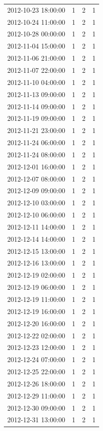 \begin{tabular}{lrrr}
2012-10-23 18:00:00 & 1 & 2 & 1 \\
2012-10-24 11:00:00 & 1 & 2 & 1 \\
2012-10-28 00:00:00 & 1 & 2 & 1 \\
2012-11-04 15:00:00 & 1 & 2 & 1 \\
2012-11-06 21:00:00 & 1 & 2 & 1 \\
2012-11-07 22:00:00 & 1 & 2 & 1 \\
2012-11-10 04:00:00 & 1 & 2 & 1 \\
2012-11-13 09:00:00 & 1 & 2 & 1 \\
2012-11-14 09:00:00 & 1 & 2 & 1 \\
2012-11-19 09:00:00 & 1 & 2 & 1 \\
2012-11-21 23:00:00 & 1 & 2 & 1 \\
2012-11-24 06:00:00 & 1 & 2 & 1 \\
2012-11-24 08:00:00 & 1 & 2 & 1 \\
2012-12-01 16:00:00 & 1 & 2 & 1 \\
2012-12-07 08:00:00 & 1 & 2 & 1 \\
2012-12-09 09:00:00 & 1 & 2 & 1 \\
2012-12-10 03:00:00 & 1 & 2 & 1 \\
2012-12-10 06:00:00 & 1 & 2 & 1 \\
2012-12-11 14:00:00 & 1 & 2 & 1 \\
2012-12-14 14:00:00 & 1 & 2 & 1 \\
2012-12-15 13:00:00 & 1 & 2 & 1 \\
2012-12-16 13:00:00 & 1 & 2 & 1 \\
2012-12-19 02:00:00 & 1 & 2 & 1 \\
2012-12-19 06:00:00 & 1 & 2 & 1 \\
2012-12-19 11:00:00 & 1 & 2 & 1 \\
2012-12-19 16:00:00 & 1 & 2 & 1 \\
2012-12-20 16:00:00 & 1 & 2 & 1 \\
2012-12-22 02:00:00 & 1 & 2 & 1 \\
2012-12-23 12:00:00 & 1 & 2 & 1 \\
2012-12-24 07:00:00 & 1 & 2 & 1 \\
2012-12-25 22:00:00 & 1 & 2 & 1 \\
2012-12-26 18:00:00 & 1 & 2 & 1 \\
2012-12-29 11:00:00 & 1 & 2 & 1 \\
2012-12-30 09:00:00 & 1 & 2 & 1 \\
2012-12-31 13:00:00 & 1 & 2 & 1 \\

\end{tabular}
